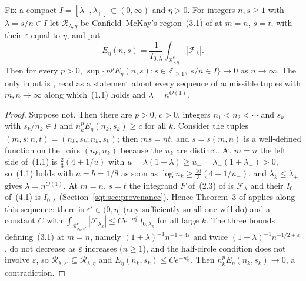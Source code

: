 \begin{lemma}\label{sqt:lem:sequential}
Fix a compact $I=[\lambda_-,\lambda_+]\subset(0,\infty)$ and $\eta>0$. For
integers $n,s\ge1$ with $\lambda=s/n\in I$ let $\mathcal R_{\lambda,\eta}$ be
Canfield--McKay's region~(3.1) of \cite{CM} at $m=n$, $s=t$, with their
$\varepsilon$ equal to $\eta$, and put
\[
 E_\eta(n,s)=\frac1{I_{0,\lambda}}\int_{\mathcal R_{\lambda,\eta}^c}|\mathcal F_\lambda| .
\]
Then for every $p>0$,
$\sup\{n^pE_\eta(n,s):s\in\mathbb Z_{\ge1},\ s/n\in I\}\to0$ as $n\to\infty$.
The only input is \cite[Theorem~3]{CM}, read as a statement about every
sequence of admissible tuples with $m,n\to\infty$ along which~(1.1) holds and
$\lambda=n^{O(1)}$.
\end{lemma}
\begin{proof}
Suppose not. Then there are $p>0$, $c>0$, integers $n_1<n_2<\cdots$ and
$s_k$ with $s_k/n_k\in I$ and $n_k^pE_\eta(n_k,s_k)\ge c$ for all $k$.
Consider the tuples $(m,s;n,t)=(n_k,s_k;n_k,s_k)$; then $ms=nt$, and
$s=s(m,n)$ is a well-defined function on the pairs $(n_k,n_k)$ because the
$n_k$ are distinct. At $m=n$ the left side of~(1.1) is
$\tfrac23(4+1/u)$ with $u=\lambda(1+\lambda)\ge u_-=\lambda_-(1+\lambda_-)>0$,
so~(1.1) holds with $a=b=1/8$ as soon as
$\log n_k\ge\tfrac{16}3(4+1/u_-)$, and $\lambda_k\le\lambda_+$ gives
$\lambda=n^{O(1)}$. At $m=n$, $s=t$ the integrand $F$ of~(2.3) of
\cite{CM} is $\mathcal F_\lambda$ and their $I_0$ of~(4.1) is $I_{0,\lambda}$
(Section~\ref{sqt:sec:provenance}). Hence Theorem~3 of \cite{CM} applies along
this sequence: there is $\varepsilon'\in(0,\eta]$ (any sufficiently small one
will do) and a constant $C$ with
$\int_{\mathcal R_{\lambda_k,\varepsilon'}^c}|\mathcal F_{\lambda_k}|\le
Ce^{-n_k^{\varepsilon'}}I_{0,\lambda_k}$ for all large $k$. The three bounds
defining~(3.1) at $m=n$, namely $(1+\lambda)^{-1}n^{-1+4\varepsilon}$ and
twice $(1+\lambda)^{-1}n^{-1/2+\varepsilon}$, do not decrease as
$\varepsilon$ increases ($n\ge1$), and the half-circle condition does not
involve $\varepsilon$, so
$\mathcal R_{\lambda,\varepsilon'}\subseteq\mathcal R_{\lambda,\eta}$ and
$E_\eta(n_k,s_k)\le Ce^{-n_k^{\varepsilon'}}$. Then
$n_k^pE_\eta(n_k,s_k)\to0$, a contradiction.
\end{proof}

